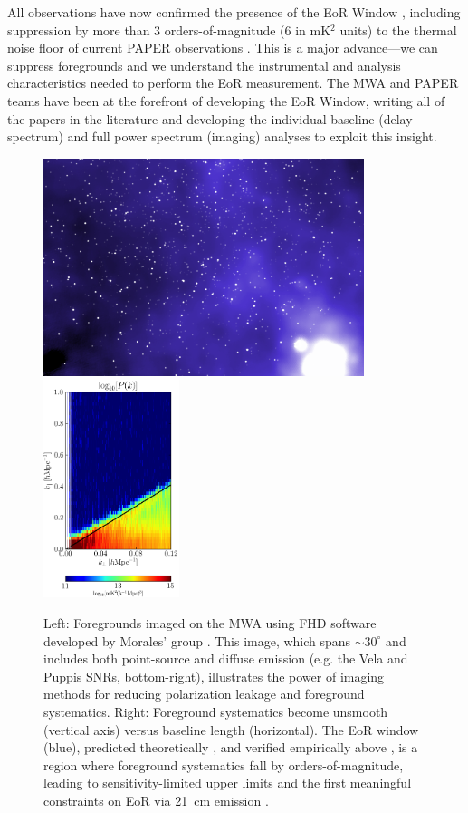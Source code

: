\documentclass[preprint]{aastex}
\begin{document}
All observations have now confirmed the presence of the EoR Window
\citep{pober_et_al2013,dillon_et_al2013b}, including suppression by more than 3
orders-of-magnitude (6 in mK$^{2}$ units) to the thermal noise floor of current
PAPER observations \citep{parsons_et_al2013}. This is a major advance---we can
suppress foregrounds and we understand the instrumental and analysis
characteristics needed to perform the EoR measurement. The MWA and PAPER teams
have been at the forefront of developing the EoR Window, writing all of the
papers in the literature and developing the individual baseline
(delay-spectrum) and full power spectrum (imaging) analyses to exploit this
insight. 



\begin{figure}[t]
\centering
\includegraphics[height=2.5in]{plots/MWApretty_crop.png}
~ %
\includegraphics[height=2.5in]{plots/wedge_tall.png}
\caption{\small
Left: Foregrounds imaged on the MWA using FHD software
developed by Morales' group \citep{sullivan_et_al2012}.
This image, which
spans $\sim$$30^{\circ}$ and includes both point-source and diffuse emission 
(e.g. the Vela and Puppis SNRs, bottom-right), illustrates the power of imaging methods for reducing
polarization leakage and foreground systematics.
Right: Foreground systematics become unsmooth (vertical axis) versus
baseline length (horizontal).  The EoR window (blue), predicted
theoretically \citep{morales_et_al2012,parsons_et_al2012b,vedantham_2012,Datta_2010}, and
verified empirically above \citep{pober_et_al2013},
is a region where foreground systematics
fall by orders-of-magnitude, leading to sensitivity-limited
upper limits and the first meaningful constraints
on EoR via 21~cm emission \citep{parsons_et_al2013}.
}\label{fig:twoFGViews}
\end{figure}
\end{document}

